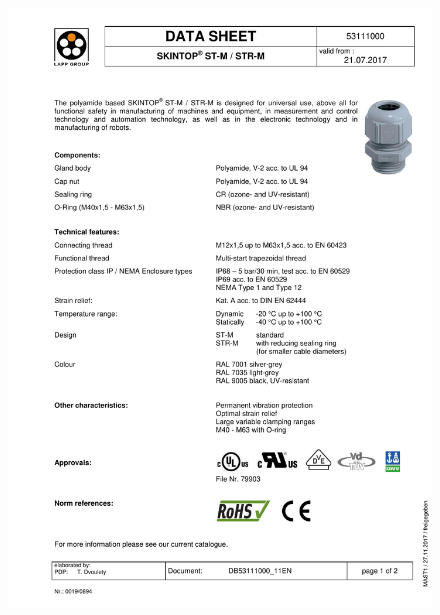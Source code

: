 \documentclass[../main.tex]{subfiles}
\begin{document}
\begin{figure}[H]
	\centering
	\includegraphics[page={2},width=\textwidth]{img/specs/gland.pdf}
\end{figure}


\end{document}
